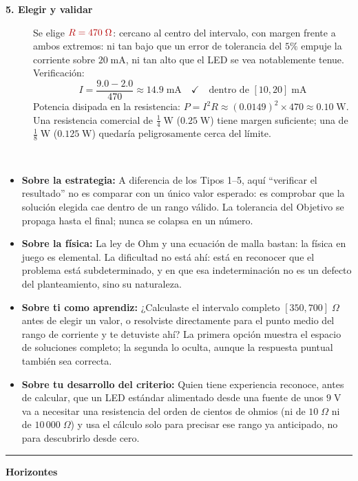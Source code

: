 \documentclass[11pt]{book}
\newcommand{\incog}[1]{\textcolor{colIncog}{#1}}
\begin{document}
\begin{enumerate}
\begin{description}
\begin{description}
    \item[\textbf{5. Elegir y validar}] Se elige $\incog{R = 470\;\Omega}$: cercano al centro del intervalo, con margen frente a ambos extremos: ni tan bajo que un error de tolerancia del $5\%$ empuje la corriente sobre $20\;\text{mA}$, ni tan alto que el LED se vea notablemente tenue. Verificación:
    \[
        I = \frac{9.0-2.0}{470} \approx 14.9\;\text{mA} \quad \checkmark \quad \text{dentro de } [10,20]\;\text{mA}
    \]
    Potencia disipada en la resistencia: $P = I^2 R \approx (0.0149)^2 \times 470 \approx 0.10\;\text{W}$. Una resistencia comercial de $\tfrac{1}{4}\;\text{W}$ ($0.25\;\text{W}$) tiene margen suficiente; una de $\tfrac{1}{8}\;\text{W}$ ($0.125\;\text{W}$) quedaría peligrosamente cerca del límite.
\end{description}

\item[Reflexionar]~
\begin{itemize}
    \item {\bf Sobre la estrategia:} A diferencia de los Tipos 1--5, aquí ``verificar el resultado'' no es comparar con un único valor esperado: es comprobar que la solución elegida cae dentro de un rango válido. La tolerancia del Objetivo se propaga hasta el final; nunca se colapsa en un número.
    \item {\bf Sobre la física:} La ley de Ohm y una ecuación de malla bastan: la física en juego es elemental. La dificultad no está ahí: está en reconocer que el problema está subdeterminado, y en que esa indeterminación no es un defecto del planteamiento, sino su naturaleza.
    \item {\bf Sobre ti como aprendiz:} ¿Calculaste el intervalo completo $[350,700]\;\Omega$ antes de elegir un valor, o resolviste directamente para el punto medio del rango de corriente y te detuviste ahí? La primera opción muestra el espacio de soluciones completo; la segunda lo oculta, aunque la respuesta puntual también sea correcta.
    \item {\bf Sobre tu desarrollo del criterio:} Quien tiene experiencia reconoce, antes de calcular, que un LED estándar alimentado desde una fuente de unos $9\;\text{V}$ va a necesitar una resistencia del orden de cientos de ohmios (ni de $10\;\Omega$ ni de $10\,000\;\Omega$) y usa el cálculo solo para precisar ese rango ya anticipado, no para descubrirlo desde cero.
\end{itemize}

\medskip
\noindent\rule{\linewidth}{0.4pt}
\noindent\textbf{Horizontes}
\medskip


\end{description}
\end{enumerate}
\end{document}
